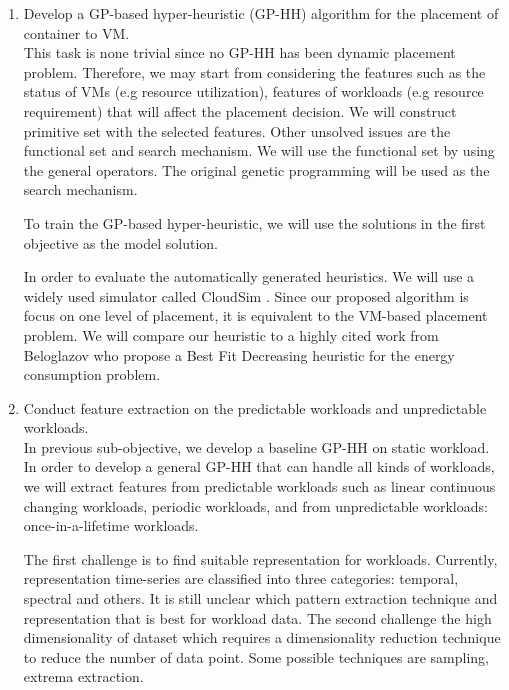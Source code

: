 \begin{enumerate}

	\item Develop a GP-based hyper-heuristic (GP-HH) algorithm for the placement of container to VM. \\
	 This task is none trivial since no GP-HH has been dynamic placement problem. Therefore, we may start from considering the features such as the status of VMs (e.g resource utilization), features of workloads (e.g resource requirement) that will affect the placement decision. We will construct primitive set with the selected features. Other unsolved issues are the functional set and search mechanism. We will use the functional set by using the general operators. The original genetic programming will be used as the search mechanism. 

	To train the GP-based hyper-heuristic, we will use the solutions in the first objective as the model solution. 

	In order to evaluate the automatically generated heuristics. We will use a widely used simulator called CloudSim \cite{}. Since our proposed algorithm is focus on one level of placement, it is equivalent to the VM-based placement problem. We will compare our heuristic to a highly cited work \cite{Beloglazov:2012ji} from Beloglazov who propose a Best Fit Decreasing heuristic for the energy consumption problem.

	\item Conduct feature extraction on the predictable workloads and unpredictable workloads. \\
	 In previous sub-objective, we develop a baseline GP-HH on static workload. In order to develop a general GP-HH that can handle all kinds of workloads, we will extract features from predictable workloads such as linear continuous changing workloads, periodic workloads, and from unpredictable workloads: once-in-a-lifetime workloads. 

	The first challenge is to find suitable representation for workloads. Currently, representation time-series are classified into three categories: temporal, spectral and others. It is still unclear which pattern extraction technique and representation that is best for workload data. The second challenge the high dimensionality of dataset which requires a dimensionality reduction technique to reduce the number of data point. Some possible techniques are sampling, extrema extraction.


\end{enumerate}
